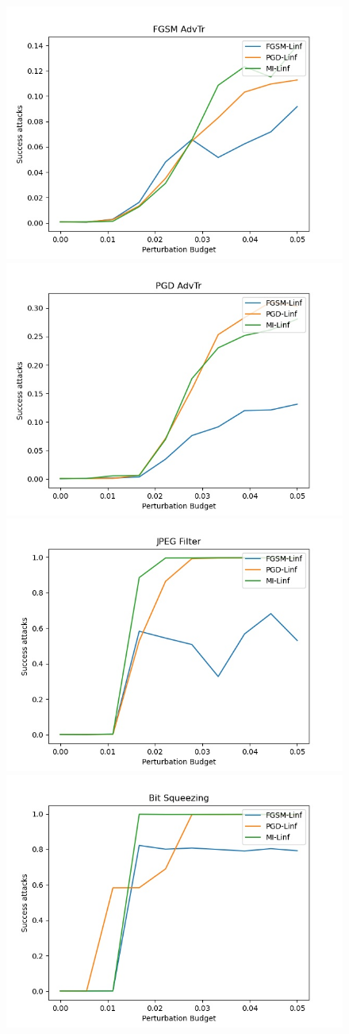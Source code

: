 \begin{figure}
  \centering
    {\includegraphics[width=0.49\linewidth]{images/exp3/targeted/FGSM_AdvTr_succ.jpg}}
    {\includegraphics[width=0.49\linewidth]{images/exp3/targeted/PGD_AdvTr_succ.jpg}}
    {\includegraphics[width=0.49\linewidth]{images/exp3/targeted/JPEG_Filter_succ.jpg}}
    {\includegraphics[width=0.49\linewidth]{images/exp3/targeted/Bit_Squeezing_succ.jpg}}

\end{figure}
